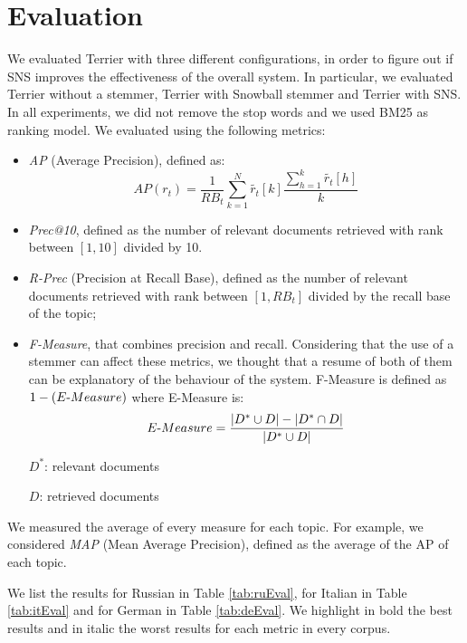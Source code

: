 \section{Evaluation}
We evaluated Terrier\cite{terrier} with three different configurations, in order to figure out if SNS improves the effectiveness of the overall system. In particular, we evaluated Terrier without a stemmer, Terrier with Snowball\cite{snowball} stemmer and Terrier with SNS. In all experiments, we did not remove the stop words and we used BM25 as ranking model. We evaluated using the following metrics:

\begin{itemize}
\item \emph{AP} (Average Precision), defined as:
\begin{equation}
AP(r_t)=\frac{1}{RB_t}\sum_{k=1}^{N}\widetilde{r_t}[k]\frac{\sum_{h=1}^{k}\widetilde{r_t}[h]}{k}
\end{equation}

\item \emph{Prec@10}, defined as the number of relevant documents retrieved with rank between $[1, 10]$ divided by 10.

\item \emph{R-Prec} (Precision at Recall Base), defined as the number of relevant documents retrieved with rank between $[1,RB_t]$ divided by the recall base of the topic;

\item \emph{F-Measure}, that combines precision and recall. Considering that the use of a stemmer can affect these metrics, we thought that a resume of both of them can be explanatory of the behaviour of the system. F-Measure is defined as $1 - (E\textnormal{-}Measure)$ where E-Measure is:
\begin{equation}
E\textnormal{-}Measure=\frac{|D^{*}\cup D|-|D^{*}\cap D|}{|D^{*}\cup D|}
\end{equation}

$D^{*}$: relevant documents

$D$: retrieved documents

\end{itemize}

We measured the average of every measure for each topic. For example, we considered \emph{MAP} (Mean Average Precision), defined as the average of the AP of each topic.

We list the results for Russian in Table \ref{tab:ruEval}, for Italian in Table \ref{tab:itEval} and for German in Table \ref{tab:deEval}. We highlight in bold the best results and in italic the worst results for each metric in every corpus.

